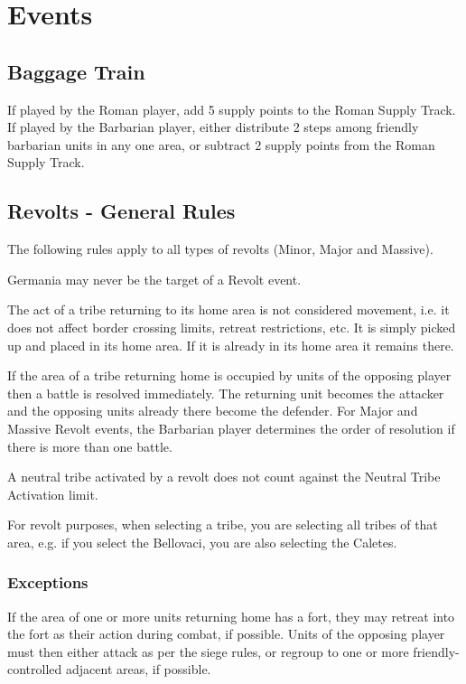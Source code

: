 \clearpage
\section{Events}
\subsection{Baggage Train}
If played by the Roman player, add 5 supply points to the Roman
Supply Track. If played by the Barbarian player, either distribute
2 steps among friendly barbarian units in any one area, or subtract 2
supply points from the Roman Supply Track.

\subsection{Revolts - General Rules}
The following rules apply to all types of revolts (Minor, Major and Massive).

Germania may never be the target of a Revolt event.

The act of a tribe returning to its home area is not considered movement, i.e. it does not affect border crossing limits, retreat restrictions, etc. It is simply picked up and placed in its home area. If it is already in its home area it remains there.

If the area of a tribe returning home is occupied by units of the opposing player then a battle is resolved immediately. The returning unit becomes the attacker and the opposing units already there become the defender. For Major and Massive Revolt events, the Barbarian player determines the order of resolution if there is more than one battle.

A neutral tribe activated by a revolt does not count against the Neutral Tribe Activation limit.

For revolt purposes, when selecting a tribe, you are selecting all tribes of that area, e.g. if you select the Bellovaci, you are also selecting the Caletes.

\subsubsection{Exceptions}

If the area of one or more units returning home has a fort, they may retreat into the fort as their action during combat, if possible. Units of the opposing player must then either attack as per the siege rules, or regroup to one or more friendly-controlled adjacent areas, if possible.

